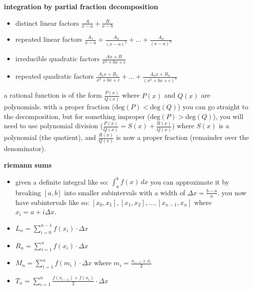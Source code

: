 \documentclass{article}
\begin{document}
\textbf{integration by partial fraction decomposition}
	\begin{itemize}
		\item distinct linear factors $\frac{A}{x - a} + \frac{B}{x - b}$
		\item repeated linear factors $\frac{A_1}{x - a} + \frac{A_2}{(x - a)^2} + \ldots + \frac{A_n}{(x - a)^n}$
		\item irreducible quadratic factors $\frac{Ax + B}{x^2 + bx + c}$
		\item repeated quadratic factors $\frac{A_1x + B_1}{x^2 + bx + c} + \ldots + \frac{A_nx + B_n}{(x^2 + bx + c)^n}$
	\end{itemize}

a rational function is of the form $\frac{P(x)}{Q(x)}$ where $P(x)$ and $Q(x)$ are polynomials. with a proper fraction ($\text{deg}(P) < \text{deg}(Q)$) you can go straight to the decomposition, but for something improper ($\text{deg}(P) > \text{deg}(Q)$), you will need to use polynomial division ($\frac{P(x)}{Q(x)} = S(x) + \frac{R(x)}{Q(x)}$) where $S(x)$ is a polynomial (the quotient), and $\frac{R(x)}{Q(x)}$ is now a proper fraction (remainder over the denominator).

\textbf{riemann sums}
	\begin{itemize}
		\item given a definite integral like so: $\int_{a}^{b}f(x)\,dx$ you can approximate it by breaking $[a, b]$ into smaller subintervals with a width of $\Delta x = \frac{b - a}{n}$. you now have subintervals like so: $[x_0, x_1], [x_1, x_2], \ldots, [x_{n-1}, x_n]$ where $x_i = a + i\Delta x$.
		\item $L_n = \sum_{i = 0}^{n - 1}f(x_i) \cdot \Delta x$ 
		\item $R_n = \sum_{i = 1}^{n}f(x_i) \cdot \Delta x$
		\item $M_n = \sum_{i = 1}^{n}f(m_i) \cdot \Delta x$ where $m_i = \frac{x_{i-1} + x_i}{2}$
		\item $T_n = \sum_{i = 1}^{n}\frac{f(x_{i - 1}) + f(x_i)}{2} \cdot \Delta x$
	\end{itemize}
\end{document}
